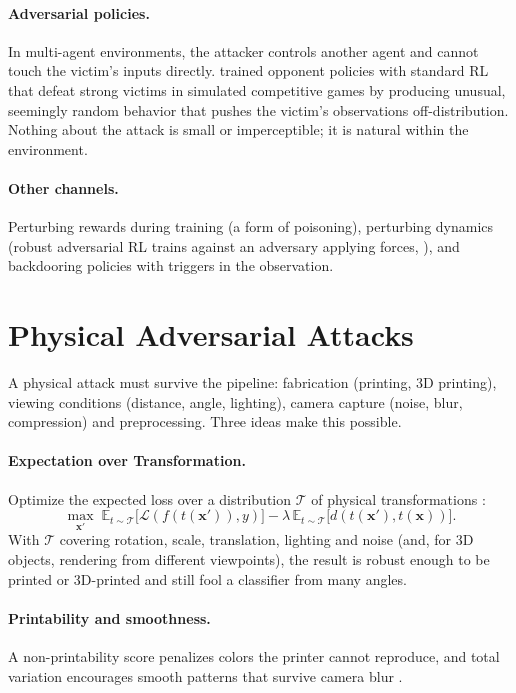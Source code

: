 \documentclass[10pt,a4paper]{extarticle}
\theoremstyle{definition}
\newcommand{\Loss}{\mathcal{L}}
\newcommand{\x}{\mathbf{x}}
\newcommand{\xadv}{\mathbf{x}'}
\begin{document}
\paragraph{Adversarial policies.} In multi-agent environments, the attacker controls another agent and cannot touch the victim's inputs directly. \citet{gleave2020adversarial} trained opponent policies with standard RL that defeat strong victims in simulated competitive games by producing unusual, seemingly random behavior that pushes the victim's observations off-distribution. Nothing about the attack is small or imperceptible; it is natural within the environment.

\paragraph{Other channels.} Perturbing rewards during training (a form of poisoning), perturbing dynamics (robust adversarial RL trains against an adversary applying forces, \citealp{pinto2017rarl}), and backdooring policies with triggers in the observation.

\section{Physical Adversarial Attacks}\label{sec:physical}

A physical attack must survive the pipeline: fabrication (printing, 3D printing), viewing conditions (distance, angle, lighting), camera capture (noise, blur, compression) and preprocessing. Three ideas make this possible.

\paragraph{Expectation over Transformation.} Optimize the expected loss over a distribution \(\mathcal{T}\) of physical transformations \citep{athalye2018eot}:
\[
\max_{\xadv}\;\mathbb{E}_{t\sim\mathcal{T}}\big[\Loss(f(t(\xadv)),y)\big]-\lambda\,\mathbb{E}_{t\sim\mathcal{T}}\big[d(t(\xadv),t(\x))\big].
\]
With \(\mathcal{T}\) covering rotation, scale, translation, lighting and noise (and, for 3D objects, rendering from different viewpoints), the result is robust enough to be printed or 3D-printed and still fool a classifier from many angles.

\paragraph{Printability and smoothness.} A non-printability score penalizes colors the printer cannot reproduce, and total variation encourages smooth patterns that survive camera blur \citep{sharif2016accessorize}.
\end{document}
